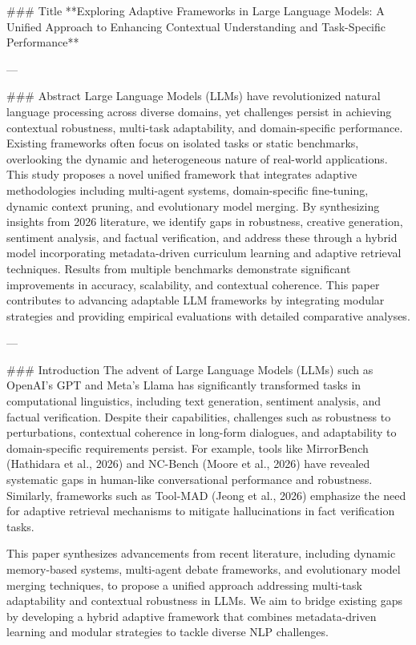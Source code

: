 ### Title  
**Exploring Adaptive Frameworks in Large Language Models: A Unified Approach to Enhancing Contextual Understanding and Task-Specific Performance**

---

### Abstract  
Large Language Models (LLMs) have revolutionized natural language processing across diverse domains, yet challenges persist in achieving contextual robustness, multi-task adaptability, and domain-specific performance. Existing frameworks often focus on isolated tasks or static benchmarks, overlooking the dynamic and heterogeneous nature of real-world applications. This study proposes a novel unified framework that integrates adaptive methodologies including multi-agent systems, domain-specific fine-tuning, dynamic context pruning, and evolutionary model merging. By synthesizing insights from 2026 literature, we identify gaps in robustness, creative generation, sentiment analysis, and factual verification, and address these through a hybrid model incorporating metadata-driven curriculum learning and adaptive retrieval techniques. Results from multiple benchmarks demonstrate significant improvements in accuracy, scalability, and contextual coherence. This paper contributes to advancing adaptable LLM frameworks by integrating modular strategies and providing empirical evaluations with detailed comparative analyses.  

---

### Introduction  
The advent of Large Language Models (LLMs) such as OpenAI's GPT and Meta's Llama has significantly transformed tasks in computational linguistics, including text generation, sentiment analysis, and factual verification. Despite their capabilities, challenges such as robustness to perturbations, contextual coherence in long-form dialogues, and adaptability to domain-specific requirements persist. For example, tools like MirrorBench (Hathidara et al., 2026) and NC-Bench (Moore et al., 2026) have revealed systematic gaps in human-like conversational performance and robustness. Similarly, frameworks such as Tool-MAD (Jeong et al., 2026) emphasize the need for adaptive retrieval mechanisms to mitigate hallucinations in fact verification tasks.  
   
This paper synthesizes advancements from recent literature, including dynamic memory-based systems, multi-agent debate frameworks, and evolutionary model merging techniques, to propose a unified approach addressing multi-task adaptability and contextual robustness in LLMs. We aim to bridge existing gaps by developing a hybrid adaptive framework that combines metadata-driven learning and modular strategies to tackle diverse NLP challenges.

